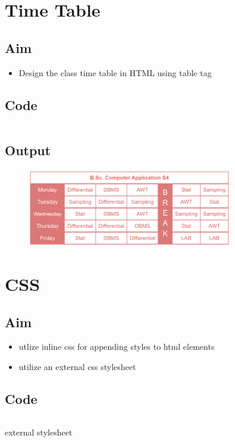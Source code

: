 \documentclass{article}
\begin{document}
\section{Time Table}
\subsection{Aim}
\begin{itemize}
	\item Design the class time table in HTML using table tag
\end{itemize}

\subsection{Code}
\inputminted[frame=lines, breaklines, breakanywhere, numberblanklines=false]{html}{./prog_2/index.html}

\newpage
\subsection{Output}
\begin{figure}[h!]
	\centering
	\includegraphics[width=0.8\textwidth]{./Assets/p0201.png}
\end{figure}
\newpage

\section{CSS}
\subsection{Aim}
\begin{itemize}
	\item utlize inline css for appending styles to html elements
	\item utilize an external css stylesheet
\end{itemize}

\subsection{Code}
\inputminted[frame=lines, breaklines, breakanywhere, numberblanklines=false]{html}{./prog_3/index.html}
external stylesheet
\inputminted[frame=lines, breaklines, breakanywhere, numberblanklines=false]{css}{./prog_3/styles.css}
\end{document}
